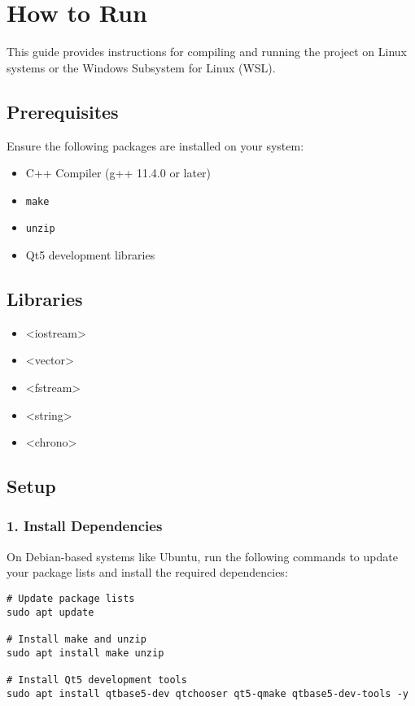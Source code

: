 \section{How to Run}

This guide provides instructions for compiling and running the project on Linux systems or the Windows Subsystem for Linux (WSL).

\subsection{Prerequisites}

Ensure the following packages are installed on your system:
\begin{itemize}
    \item C++ Compiler (g++ 11.4.0 or later)
    \item \texttt{make}
    \item \texttt{unzip}
    \item Qt5 development libraries
\end{itemize}

\subsection{Libraries}
\begin{itemize}
    \item <iostream>
    \item <vector>
    \item <fstream>
    \item <string>
    \item <chrono>
\end{itemize}

\subsection{Setup}

\subsubsection{1. Install Dependencies}

On Debian-based systems like Ubuntu, run the following commands to update your package lists and install the required dependencies:

\begin{verbatim}
# Update package lists
sudo apt update

# Install make and unzip
sudo apt install make unzip

# Install Qt5 development tools
sudo apt install qtbase5-dev qtchooser qt5-qmake qtbase5-dev-tools -y 
\end{verbatim}


